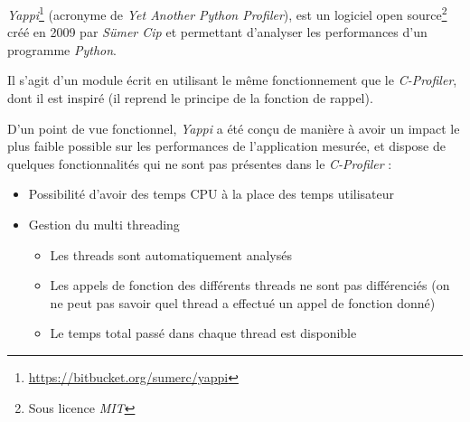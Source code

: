 \emph{Yappi}\footnote{\url{https://bitbucket.org/sumerc/yappi}} (acronyme de \emph{Yet Another Python Profiler}), est un logiciel open source\footnote{Sous licence \emph{MIT}} créé en 2009 par \emph{Sümer Cip} et permettant d'analyser les performances d'un programme \emph{Python}.

Il s'agit d'un module écrit en \C utilisant le même fonctionnement que le \emph{C-Profiler}, dont il est inspiré (il reprend le principe de la fonction de rappel).

D'un point de vue fonctionnel, \emph{Yappi} a été conçu de manière à avoir un impact le plus faible possible sur les performances de l'application mesurée, et dispose de quelques fonctionnalités qui ne sont pas présentes dans le \emph{C-Profiler} :
\begin{itemize}
\item Possibilité d'avoir des temps CPU à la place des temps utilisateur
\item Gestion du multi threading
\begin{itemize}
\item Les threads sont automatiquement analysés
\item Les appels de fonction des différents threads ne sont pas différenciés (on ne peut pas savoir quel thread a effectué un appel de fonction donné) 
\item Le temps total passé dans chaque thread est disponible
\end{itemize}
\end{itemize}